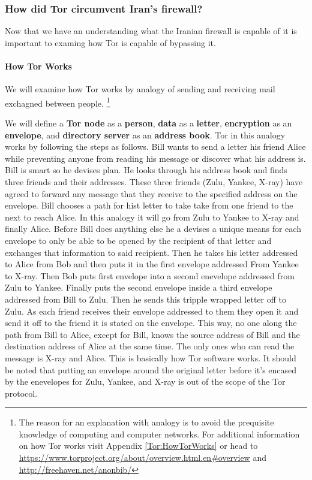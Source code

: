 \documentclass[11pt]{article}
\begin{document}
\begin{multicols}{2}
\subsubsection{How did Tor circumvent Iran's firewall?}

Now that we have an understanding what the Iranian firewall is capable of it is
important to examing how Tor is capable of bypassing it.

\paragraph{How Tor Works}
\label{HowTorWorks}
We will examine how Tor works by analogy of sending and receiving mail 
exchagned between people. 
\footnote{The reason for an explanation with analogy is to avoid the prequisite
  knowledge of computing and computer networks. For additional information on how 
  Tor works visit Appendix \ref{Tor:HowTorWorks} or head to
  \url{https://www.torproject.org/about/overview.html.en#overview} and
\url{http://freehaven.net/anonbib/}
}

We will define a \textbf{Tor node} as a \textbf{person}, \textbf{data} as a
\textbf{letter}, \textbf{encryption} as an \textbf{envelope}, and
\textbf{directory server} as an \textbf{address book}.  Tor in this analogy works
by following the steps as follows. Bill wants to send a letter his friend Alice
while preventing anyone from reading his message or discover what his address is.  Bill
is smart so he devises plan. He looks through his address book and finds three
friends and their addresses.  These three friends (Zulu, Yankee, X-ray)
have agreed to forward any message that they receive to the
specified address on the envelope. Bill chooses a path for hist letter to take take from one friend
to the next to reach Alice. In this analogy it will go from Zulu to Yankee to
X-ray and finally Alice. Before Bill does anything else he a devises a unique
means for each envelope to only be able to be opened by the recipient of that
letter and exchanges that information to said recipient.  Then he takes his letter addressed to Alice from Bob and then
puts it in the first envelope addressed From Yankee to X-ray.  Then Bob puts first
envelope into a second enevelope addressed from Zulu to Yankee.  Finally puts the second
envelope inside a third envelope addressed from Bill to Zulu.  Then he sends
this tripple wrapped letter off to Zulu.  As each friend receives their envelope addressed to them
they open it and send it off to the friend it is stated on the envelope.  This
way, no one along the path from Bill to Alice, except for Bill, knows the source address of
Bill and the destination address of Alice at the same time.  The
only ones who can read the message is X-ray and Alice. This is basically how Tor
software works. It should be noted that putting an envelope around the original letter
before it's encased by the enevelopes for Zulu, Yankee, and X-ray is out of
the scope of the Tor protocol.


\end{multicols}
\end{document}
